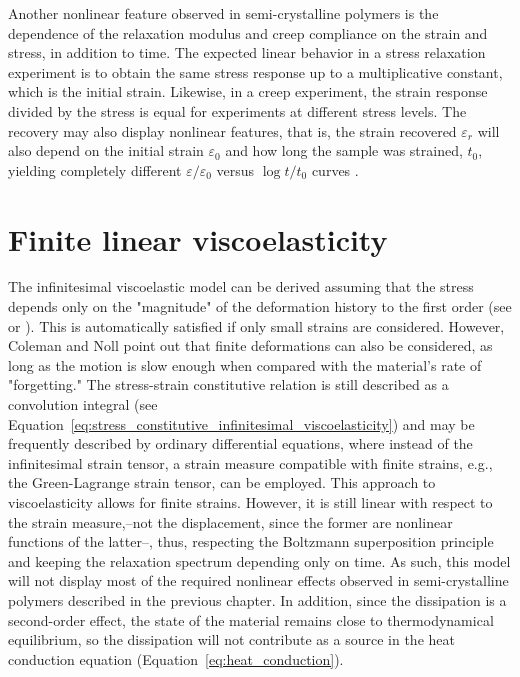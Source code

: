 Another nonlinear feature observed in semi-crystalline polymers is the dependence of the relaxation modulus and creep compliance on the strain and stress, in addition to time.
The expected linear behavior in a stress relaxation experiment is to obtain the same stress response up to a multiplicative constant, which is the initial strain.
Likewise, in a creep experiment, the strain response divided by the stress is equal for experiments at different stress levels.
The recovery may also display nonlinear features, that is, the strain recovered $\varepsilon_r$ will also depend on the initial strain $\varepsilon_0$ and how long the sample was strained, $t_0$, yielding completely different $\varepsilon/\varepsilon_0$ versus $\log t/t_0$ curves \citep{ferryViscoelasticPropertiesPolymers1980}.


\section{Finite linear viscoelasticity}
The infinitesimal viscoelastic model can be derived assuming that the stress depends only on the "magnitude" of the deformation history to the first order (see \cite{colemanFoundationsLinearViscoelasticity1961} or \cite{christensen2013theory}).
This is automatically satisfied if only small strains are considered.
However, Coleman and Noll \citep{colemanFoundationsLinearViscoelasticity1961} point out that finite deformations can also be considered, as long as the motion is slow enough when compared with the material's rate of "forgetting."
The stress-strain constitutive relation is still described as a convolution integral (see Equation~\eqref{eq:stress_constitutive_infinitesimal_viscoelasticity}) and may be frequently described by ordinary differential equations, where instead of the infinitesimal strain tensor, a strain measure compatible with finite strains, e.g., the Green-Lagrange strain tensor, can be employed.
This approach to viscoelasticity allows for finite strains.
However, it is still linear with respect to the strain measure,--not the displacement, since the former are nonlinear functions of the latter--, thus, respecting the Boltzmann superposition principle and keeping the relaxation spectrum depending only on time.
As such, this model will not display most of the required nonlinear effects observed in semi-crystalline polymers described in the previous chapter.
In addition, since the dissipation is a second-order effect, the state of the material remains close to thermodynamical equilibrium, so the dissipation will not contribute as a source in the heat conduction equation (Equation~\eqref{eq:heat_conduction}).


